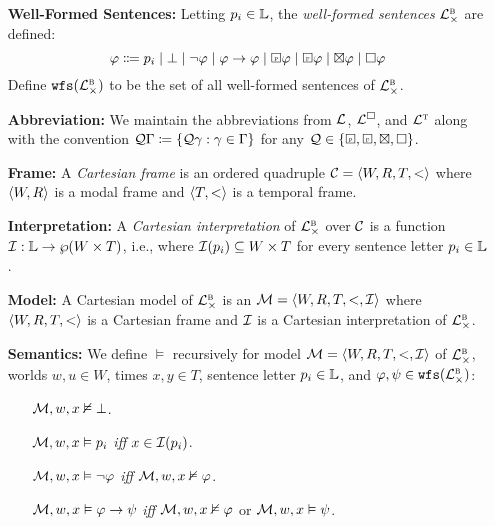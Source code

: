\documentclass[a4paper, 11pt]{article} %
\begin{document}
\begin{enumerate}[leftmargin=1.2in]
	\item[\bf Well-Formed Sentences:] Letting $p_i \in \mathbb{L}$, the \textit{well-formed sentences} $\mathcal{L}^{\textsc{b}}_\times$ are defined:
    \[ \metaA \Coloneq p_i \mid 
      \bot \mid 
      \neg\metaA \mid 
      \metaA \rightarrow \metaA \mid 
      \Past\metaA \mid 
      \Future\metaA \mid
      \boxtimes\metaA \mid
      \Box\metaA
    \]
    Define $\texttt{wfs}(\mathcal{L}^{\textsc{b}}_\times)$ to be the set of all well-formed sentences of $\mathcal{L}^{\textsc{b}}_\times$.
  \item[\bf Abbreviation:] We maintain the abbreviations from $\mathcal{L}$, $\mathcal{L}^{\square}$, and $\mathcal{L}^{\textsc{t}}$ along with the convention
    $\mathcal{Q}\Gamma \coloneq \lbrace\mathcal{Q}\gamma : \gamma \in \Gamma\rbrace$ for any $\Q \in \set{\Past, \Future, \boxtimes, \Box}$.
  \item[\bf Frame:] A \textit{Cartesian frame} is an ordered quadruple $\mathcal{C} = \langle W, R, T, <\rangle$ where $\langle W, R\rangle$ is a modal frame and $\langle T, <\rangle$ is a temporal frame. 
  \item[\bf Interpretation:] A \textit{Cartesian interpretation} of $\mathcal{L}^{\textsc{b}}_\times$ over $\mathcal{C}$ is a function $\mathcal{I} : \mathbb{L} \to \wp(W \times T)$, i.e., where $\mathcal{I}(p_i) \subseteq W \times T$ for every sentence letter $p_i \in \mathbb{L}$. 
  \item[\bf Model:] A Cartesian model of $\mathcal{L}^{\textsc{b}}_\times$ is an $\mathcal{M} = \langle W, R, T, <, \mathcal{I}\rangle$ where $\langle W, R, T, <\rangle$ is a Cartesian frame and $\mathcal{I}$ is a Cartesian interpretation of $\mathcal{L}^{\textsc{b}}_\times$.
  \item[\bf Semantics:] We define $\vDash$ recursively for model $\mathcal{M} = \langle W, R, T, <, \mathcal{I}\rangle$ of $\mathcal{L}^{\textsc{b}}_\times$, worlds $w, u \in W$, times $x, y \in T$, sentence letter $p_i \in \mathbb{L}$, and $\varphi, \psi \in \texttt{wfs}(\mathcal{L}^{\textsc{b}}_\times)$:
    \begin{itemize}[leftmargin=.15in]\small
      \item[] $\mathcal{M}, w, x \nvDash \bot$.
      \item[] $\mathcal{M}, w, x \vDash p_i$ \textit{iff} $x \in \mathcal{I}(p_i)$.
      \item[] $\mathcal{M}, w, x \vDash \neg \varphi$ \textit{iff} $\mathcal{M}, w,x\nvDash \varphi$.
      \item[] $\mathcal{M}, w, x \vDash \varphi\rightarrow \psi$ \textit{iff} $\mathcal{M}, w, x\nvDash \varphi$ or $\mathcal{M}, w, x \vDash  \psi$.

\end{itemize}
\end{enumerate}
\end{document}
